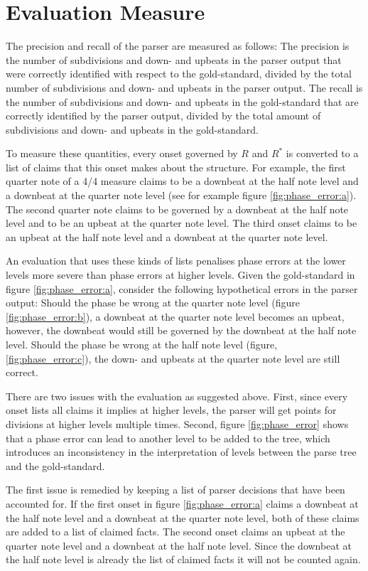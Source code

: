 \section{Evaluation Measure}
\label{sec:measure}

The precision and recall of the parser are measured as follows: The precision is the number of subdivisions and down- and upbeats in the parser output that were correctly identified with respect to the gold-standard, divided by the total number of subdivisions and down- and upbeats in the parser output. The recall is the number of subdivisions and down- and upbeats in the gold-standard that are correctly identified by the parser output, divided by the total amount of subdivisions and down- and upbeats in the gold-standard.

To measure these quantities, every onset governed by $R$ and $R^*$ is converted to a list of claims that this onset makes about the structure. For example, the first quarter note of a 4/4 measure claims to be a downbeat at the half note level and a downbeat at the quarter note level (see for example figure \ref{fig:phase_error:a}). The second quarter note claims to be governed by a downbeat at the half note level and to be an upbeat at the quarter note level. The third onset claims to be an upbeat at the half note level and a downbeat at the quarter note level. 

An evaluation that uses these kinds of lists penalises phase errors at the lower levels more severe than phase errors at higher levels. Given the gold-standard in figure \ref{fig:phase_error:a}, consider the following hypothetical errors in the parser output: Should the phase be wrong at the quarter note level (figure \ref{fig:phase_error:b}), a downbeat at the quarter note level becomes  an upbeat, however, the downbeat would still be governed by the downbeat at the half note level. Should the phase be wrong at the half note level (figure, \ref{fig:phase_error:c}), the down- and upbeats at the quarter note level are still correct.

There are two issues with the evaluation as suggested above. First, since every onset lists all claims it implies at higher levels, the parser will get points for divisions at higher levels multiple times. Second, figure \ref{fig:phase_error} shows that a phase error can lead to another level to be added to the tree, which introduces an inconsistency in the interpretation of levels between the parse tree and the gold-standard. 

The first issue is remedied by keeping a list of parser decisions that have been accounted for. If the first onset in figure \ref{fig:phase_error:a} claims a downbeat at the half note level and a downbeat at the quarter note level, both of these claims are added to a list of claimed facts. The second onset claims an upbeat at the quarter note level and a downbeat at the half note level. Since the downbeat at the half note level is already the list of claimed facts it will not be counted again.

